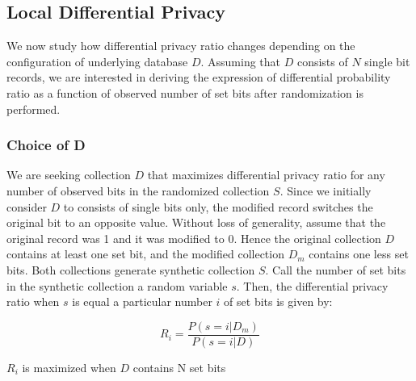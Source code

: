 \documentclass[11pt,draft]{article}
\begin{document}
\subsection{Local Differential Privacy}

We now study how differential privacy ratio changes depending  on the configuration of underlying database  $D$.  
Assuming that  $D$ consists of $N$ single bit records, we are interested in deriving the expression of differential probability ratio as a function of observed number of set bits after randomization is performed.


\subsubsection{Choice of D}

We are seeking collection $D$ that maximizes differential privacy ratio for any number of observed bits in the randomized collection $S$.   Since we initially consider $D$ to consists of single bits only, the modified record switches the original bit to an opposite value.   Without loss of generality, assume that the original record was 1 and it was modified to 0.  Hence the original collection $D$ contains at least one set bit, and the modified collection $D_m$ contains one less set bits.   Both collections generate synthetic collection $S$.   Call the number of set bits in the synthetic collection a random variable $s$.  Then, the differential privacy ratio when $s$ is equal a particular number $i$ of set bits is given by:

\[
R_i = \frac{P(s=i | D_m)}{P(s=i | D)}
\]

\begin{thm}
$R_i$  is maximized when $D$ contains N set bits
\end{thm}
\end{document}
